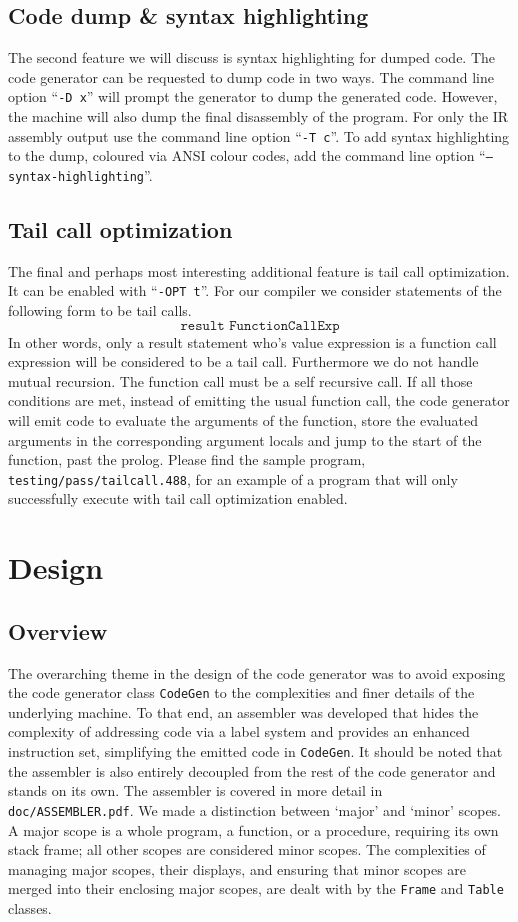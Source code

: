 \documentclass[oneside]{amsart}
\theoremstyle{definition}
\theoremstyle{remark}
\numberwithin{equation}{section}
\begin{document}
\subsection{Code dump \& syntax highlighting}
The second feature we will discuss is syntax highlighting for dumped code. The code generator can be
requested to dump code in two ways. The command line option ``\texttt{-D x}'' will prompt the
generator to dump the generated code. However, the machine will also dump the final disassembly of
the program. For only the IR assembly output use the command line option ``\texttt{-T c}''. To add
syntax highlighting to the dump, coloured via ANSI colour codes, add the command line option
``\texttt{--syntax-highlighting}''.

\subsection{Tail call optimization}
The final and perhaps most interesting additional feature is tail call optimization. It can be
enabled with ``\texttt{-OPT t}''. For our compiler we consider statements of the following form to
be tail calls.
\[\texttt{result FunctionCallExp}\]
In other words, only a result statement who's value expression is a function call expression will be
considered to be a tail call. Furthermore we do not handle mutual recursion. The function call must
be a self recursive call. If all those conditions are met, instead of emitting the usual function
call, the code generator will emit code to evaluate the arguments of the function, store the
evaluated arguments in the corresponding argument locals and jump to the start of the function, past
the prolog. Please find the sample program, \texttt{testing/pass/tailcall.488}, for an example of
a program that will only successfully execute with tail call optimization enabled.

\newpage

\section{Design}
\subsection{Overview}
The overarching theme in the design of the code generator was to avoid exposing the code generator
class \texttt{CodeGen} to the complexities and finer details of the underlying machine. To that end,
an assembler was developed that hides the complexity of addressing code via a label system and
provides an enhanced instruction set, simplifying the emitted code in \texttt{CodeGen}. It should be
noted that the assembler is also entirely decoupled from the rest of the code generator and stands
on its own. The assembler is covered in more detail in \texttt{doc/ASSEMBLER.pdf}. We made a
distinction  between `major' and `minor' scopes. A major scope is a whole program, a function, or a
procedure, requiring its own stack frame; all other scopes are considered minor scopes. The
complexities of  managing major scopes, their displays, and ensuring that minor scopes are merged
into their enclosing  major scopes, are dealt with by the \texttt{Frame} and \texttt{Table} classes.
\end{document}
